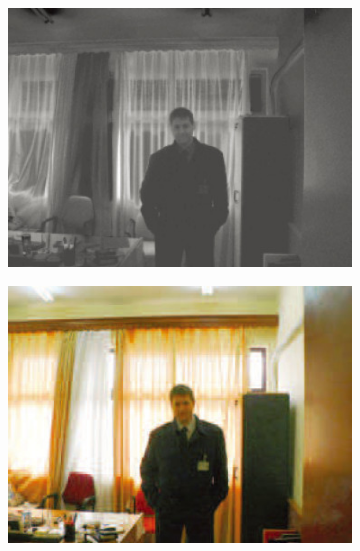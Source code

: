 \documentclass[letterpaper,10pt]{article}
\begin{document}
\begin{figure}[htbp]
\begin{subfigure}{0.11\textwidth}
					\includegraphics[width=\linewidth]{picture/LLIE/Division Gets Better/Cr2}
					\captionsetup{font=scriptsize}
					\label{fig: Cr2}	
				\end{subfigure}
				\begin{subfigure}{0.11\textwidth}
					\includegraphics[width=\linewidth]{picture/LLIE/Division Gets Better/Ours2}
					\captionsetup{font=scriptsize}
					\label{fig: Ours2}	
				\end{subfigure}\\
				

\end{figure}
\end{document}
